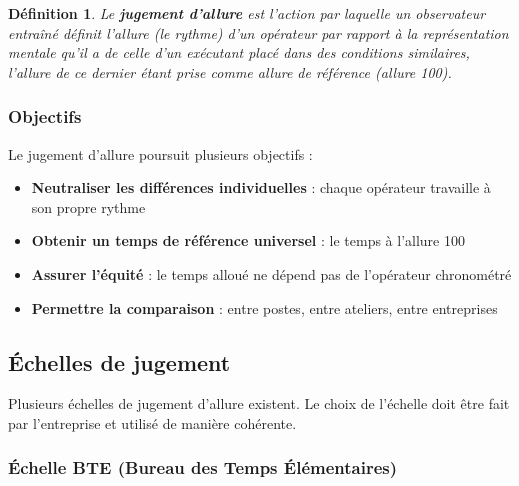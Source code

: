 \documentclass[a4paper,12pt]{article}
\newtheorem{definition}{Définition}[section]
\begin{document}
\begin{definition}
Le \textbf{jugement d'allure} est l'action par laquelle un observateur entraîné définit l'allure (le rythme) d'un opérateur par rapport à la représentation mentale qu'il a de celle d'un exécutant placé dans des conditions similaires, l'allure de ce dernier étant prise comme allure de référence (allure 100).
\end{definition}

\subsubsection{Objectifs}

Le jugement d'allure poursuit plusieurs objectifs :

\begin{itemize}
    \item \textbf{Neutraliser les différences individuelles} : chaque opérateur travaille à son propre rythme
    \item \textbf{Obtenir un temps de référence universel} : le temps à l'allure 100
    \item \textbf{Assurer l'équité} : le temps alloué ne dépend pas de l'opérateur chronométré
    \item \textbf{Permettre la comparaison} : entre postes, entre ateliers, entre entreprises
\end{itemize}

\begin{center}
\end{center}

\subsection{Échelles de jugement}

Plusieurs échelles de jugement d'allure existent. Le choix de l'échelle doit être fait par l'entreprise et utilisé de manière cohérente.

\subsubsection{Échelle BTE (Bureau des Temps Élémentaires)}
\end{document}
